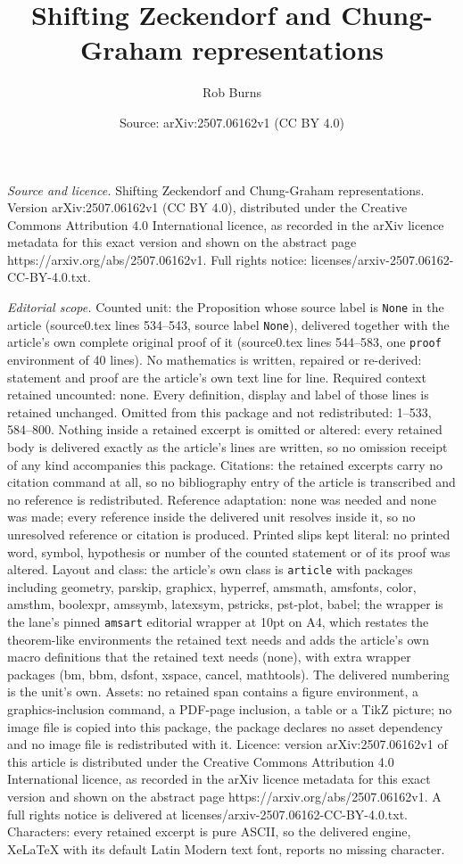 \documentclass[10pt,a4paper]{amsart}
\title[Shifting Zeckendorf and Chung-Graham representations]{Shifting Zeckendorf and Chung-Graham representations}
\author{Rob Burns}
\date{Source: arXiv:2507.06162v1 (CC BY 4.0)}
\begin{document}
\maketitle

\noindent\emph{Source and licence.} Shifting Zeckendorf and Chung-Graham representations. Version arXiv:2507.06162v1 (CC BY 4.0), distributed under the Creative Commons Attribution 4.0 International licence, as recorded in the arXiv licence metadata for this exact version and shown on the abstract page https://arxiv.org/abs/2507.06162v1. Full rights notice: licenses/arxiv-2507.06162-CC-BY-4.0.txt.\par\smallskip

\noindent\textit{Editorial scope.} Counted unit: the Proposition whose source label is \texttt{None} in the article (source0.tex lines 534--543, source label \texttt{None}), delivered together with the article's own complete original proof of it (source0.tex lines 544--583, one \texttt{proof} environment of 40 lines). No mathematics is written, repaired or re-derived: statement and proof are the article's own text line for line. Required context retained uncounted: none. Every definition, display and label of those lines is retained unchanged. Omitted from this package and not redistributed: 1--533, 584--800. Nothing inside a retained excerpt is omitted or altered: every retained body is delivered exactly as the article's lines are written, so no omission receipt of any kind accompanies this package. Citations: the retained excerpts carry no citation command at all, so no bibliography entry of the article is transcribed and no reference is redistributed. Reference adaptation: none was needed and none was made; every reference inside the delivered unit resolves inside it, so no unresolved reference or citation is produced. Printed slips kept literal: no printed word, symbol, hypothesis or number of the counted statement or of its proof was altered. Layout and class: the article's own class is \texttt{article} with packages including geometry, parskip, graphicx, hyperref, amsmath, amsfonts, color, amsthm, boolexpr, amssymb, latexsym, pstricks, pst-plot, babel; the wrapper is the lane's pinned \texttt{amsart} editorial wrapper at 10pt on A4, which restates the theorem-like environments the retained text needs and adds the article's own macro definitions that the retained text needs (none), with extra wrapper packages (bm, bbm, dsfont, xspace, cancel, mathtools). The delivered numbering is the unit's own. Assets: no retained span contains a figure environment, a graphics-inclusion command, a PDF-page inclusion, a table or a TikZ picture; no image file is copied into this package, the package declares no asset dependency and no image file is redistributed with it. Licence: version arXiv:2507.06162v1 of this article is distributed under the Creative Commons Attribution 4.0 International licence, as recorded in the arXiv licence metadata for this exact version and shown on the abstract page https://arxiv.org/abs/2507.06162v1. A full rights notice is delivered at licenses/arxiv-2507.06162-CC-BY-4.0.txt. Characters: every retained excerpt is pure ASCII, so the delivered engine, XeLaTeX with its default Latin Modern text font, reports no missing character.
\end{document}
